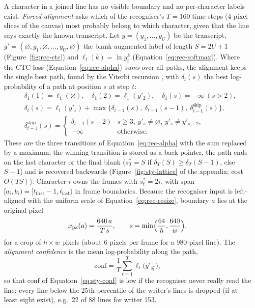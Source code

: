 A character in a joined line has no visible boundary and no per-character labels exist.
\emph{Forced alignment} asks which of the recogniser's $T=160$ time steps (4-pixel slices of the canvas) most probably belong to which character, given that the line says exactly the known transcript.
Let $y=(y_1,\ldots,y_U)$ be the transcript, $y'=(\varnothing,y_1,\varnothing,\ldots,y_U,\varnothing)$ the blank-augmented label of length $S=2U+1$ (Figure~\ref{fig:rec-ctc}) and $\ell_t(k)=\ln y_t^k$ (Equation~\ref{eq:rec-softmax}).
Where the CTC loss (Equation~\ref{eq:rec-alpha}) \emph{sums} over all paths, the alignment keeps the single best path, found by the Viterbi recursion \cite{viterbi1967}, with $\delta_t(s)$ the best log-probability of a path at position $s$ at step $t$:
\begin{equation}
\begin{split}
&\delta_1(1)=\ell_1(\varnothing),\quad\delta_1(2)=\ell_1(y'_2),\quad\delta_1(s)=-\infty\ (s>2),\\
&\delta_t(s)=\ell_t(y'_s)+\max\bigl\{\delta_{t-1}(s),\ \delta_{t-1}(s-1),\ \delta^{\mathrm{skip}}_{t-1}(s)\bigr\},\\
&\delta^{\mathrm{skip}}_{t-1}(s)=\begin{cases}\delta_{t-1}(s-2)&s\ge3,\ y'_s\ne\varnothing,\ y'_s\ne y'_{s-2},\\-\infty&\text{otherwise.}\end{cases}
\end{split}
\label{eq:sty-viterbi}
\end{equation}
These are the three transitions of Equation~\ref{eq:rec-alpha} with the sum replaced by a maximum; the winning transition is stored as a back-pointer, the path ends on the last character or the final blank ($s^*_T=S$ if $\delta_T(S)\ge\delta_T(S-1)$, else $S-1$) and is recovered backwards (Figure~\ref{fig:sty-lattice} of the appendix; cost $O(TS)$).
Character $i$ owns the frames with $s^*_t=2i$, with span $[a_i,b_i)=[t_{\mathrm{first}}-1,t_{\mathrm{last}})$ in frame boundaries.
Because the recogniser input is left-aligned with the uniform scale of Equation~\ref{eq:rec-resize}, boundary $a$ lies at the original pixel
\begin{equation}
x_{\mathrm{px}}(a)=\frac{640\,a}{T\,s},\qquad s=\min\Bigl(\frac{64}{h},\frac{640}{w}\Bigr),
\label{eq:sty-f2p}
\end{equation}
for a crop of $h\times w$ pixels (about 6 pixels per frame for a 980-pixel line).
The \emph{alignment confidence} is the mean log-probability along the path,
\begin{equation}
\mathrm{conf}=\frac1T\sum_{t=1}^{T}\ell_t\bigl(y'_{s^*_t}\bigr),
\label{eq:sty-conf}
\end{equation}
so that $\mathrm{conf}$ of Equation~\ref{eq:sty-conf} is low if the recogniser never really read the line; every line below the 25th percentile of the writer's lines is dropped (if at least eight exist), e.g.\ 22 of 88 lines for writer 153.

